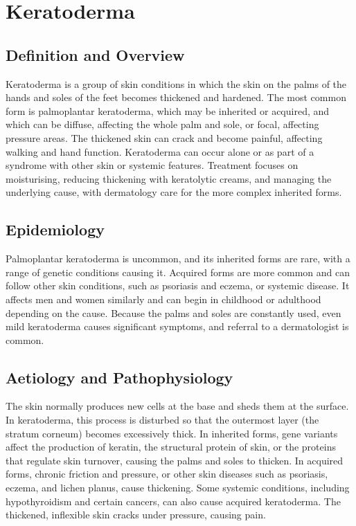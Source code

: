 \chapter{Keratoderma}

\section*{Definition and Overview}
Keratoderma is a group of skin conditions in which the skin on the palms of the hands and soles of the feet becomes thickened and hardened. The most common form is palmoplantar keratoderma, which may be inherited or acquired, and which can be diffuse, affecting the whole palm and sole, or focal, affecting pressure areas. The thickened skin can crack and become painful, affecting walking and hand function. Keratoderma can occur alone or as part of a syndrome with other skin or systemic features. Treatment focuses on moisturising, reducing thickening with keratolytic creams, and managing the underlying cause, with dermatology care for the more complex inherited forms.

\section*{Epidemiology}
Palmoplantar keratoderma is uncommon, and its inherited forms are rare, with a range of genetic conditions causing it. Acquired forms are more common and can follow other skin conditions, such as psoriasis and eczema, or systemic disease. It affects men and women similarly and can begin in childhood or adulthood depending on the cause. Because the palms and soles are constantly used, even mild keratoderma causes significant symptoms, and referral to a dermatologist is common.

\section*{Aetiology and Pathophysiology}
The skin normally produces new cells at the base and sheds them at the surface. In keratoderma, this process is disturbed so that the outermost layer (the stratum corneum) becomes excessively thick. In inherited forms, gene variants affect the production of keratin, the structural protein of skin, or the proteins that regulate skin turnover, causing the palms and soles to thicken. In acquired forms, chronic friction and pressure, or other skin diseases such as psoriasis, eczema, and lichen planus, cause thickening. Some systemic conditions, including hypothyroidism and certain cancers, can also cause acquired keratoderma. The thickened, inflexible skin cracks under pressure, causing pain.

